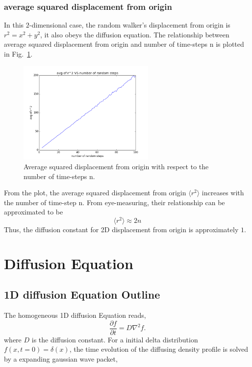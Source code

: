 \documentclass[a4paper,12pt]{article}
\begin{document}
\subsubsection{average squared displacement from origin}
In this $2$-dimensional case, the random walker's displacement from origin is $r^2 = x^2 + y^2$, it also obeys the diffusion equation. The relationship between average squared displacement from origin and number of time-steps n is plotted in Fig.~\ref{Fig:r2avg}. \\
\begin{figure}[!htb]
 \centering
  \includegraphics[width=0.6\textwidth]{pics/r2avg.png}
 \caption{Average squared displacement from origin with respect to the number of time-steps n.}
  \label{Fig:r2avg}
\end{figure}
From the plot, the average squared displacement from origin $\langle r^2 \rangle$ increases with the number of time-step n. From eye-measuring, their relationship can be approximated to be $$\langle r^2 \rangle \approx 2n$$ Thus, the diffusion constant for 2D displacement from origin is approximately $1$.

\section{Diffusion Equation}
\subsection{1D diffusion Equation Outline}
\indent
\indent The homogeneous 1D diffusion Equation reads,
\begin{equation}
	\frac{\partial f}{\partial t} = D \nabla^2 f.
\end{equation}
where $D$ is the diffusion constant. For a initial delta distribution $f(x, t = 0) = \delta(x)$, the time evolution of the diffusing density profile is solved by a expanding gaussian wave packet,
\end{document}
